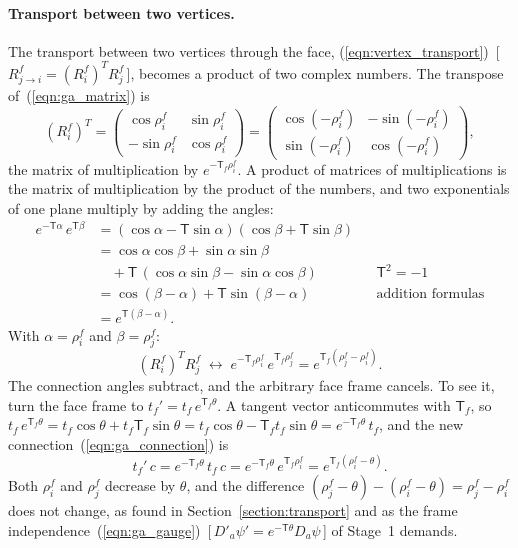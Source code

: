 \paragraph{Transport between two vertices.} The transport between two vertices through the face, (\ref{eqn:vertex_transport})~[\,$R^f_{j\to i} = (R_i^f)^T R_j^f$\,], becomes a product of two complex numbers. The transpose of~(\ref{eqn:ga_matrix}) is
\begin{equation*}
(R_i^f)^T = \begin{pmatrix} \cos\rho_i^f & \sin\rho_i^f \\ -\sin\rho_i^f & \cos\rho_i^f \end{pmatrix} = \begin{pmatrix} \cos(-\rho_i^f) & -\sin(-\rho_i^f) \\ \sin(-\rho_i^f) & \cos(-\rho_i^f) \end{pmatrix},
\end{equation*}
the matrix of multiplication by $e^{-\mathsf T_f\rho_i^f}$. A product of matrices of multiplications is the matrix of multiplication by the product of the numbers, and two exponentials of one plane multiply by adding the angles:
\begin{align*}
e^{-\mathsf T\alpha}\, e^{\mathsf T\beta} &= (\cos\alpha - \mathsf T\sin\alpha)(\cos\beta + \mathsf T\sin\beta) \\
&= \cos\alpha\cos\beta + \sin\alpha\sin\beta \\
&\quad + \mathsf T\,(\cos\alpha\sin\beta - \sin\alpha\cos\beta) && \mathsf T^2 = -1 \\
&= \cos(\beta - \alpha) + \mathsf T\sin(\beta - \alpha) && \text{addition formulas} \\
&= e^{\mathsf T(\beta - \alpha)} .
\end{align*}
With $\alpha = \rho_i^f$ and $\beta = \rho_j^f$:
\begin{equation*}
(R_i^f)^T R_j^f \;\longleftrightarrow\; e^{-\mathsf T_f\rho_i^f}\, e^{\mathsf T_f\rho_j^f} = e^{\mathsf T_f(\rho_j^f - \rho_i^f)} .
\end{equation*}
The connection angles subtract, and the arbitrary face frame cancels. To see it, turn the face frame to $t_f' = t_f\,e^{\mathsf T_f\theta}$. A tangent vector anticommutes with $\mathsf T_f$, so $t_f\,e^{\mathsf T_f\theta} = t_f\cos\theta + t_f\mathsf T_f\sin\theta = t_f\cos\theta - \mathsf T_f t_f\sin\theta = e^{-\mathsf T_f\theta}\, t_f$, and the new connection~(\ref{eqn:ga_connection}) is
\begin{equation*}
t_f'\, c = e^{-\mathsf T_f\theta}\, t_f\, c = e^{-\mathsf T_f\theta}\, e^{\mathsf T_f\rho_i^f} = e^{\mathsf T_f(\rho_i^f - \theta)} .
\end{equation*}
Both $\rho_i^f$ and $\rho_j^f$ decrease by $\theta$, and the difference $(\rho_j^f - \theta) - (\rho_i^f - \theta) = \rho_j^f - \rho_i^f$ does not change, as found in Section~\ref{section:transport} and as the frame independence~(\ref{eqn:ga_gauge})~[\,$D'_a\psi' = e^{-\mathsf T\theta}D_a\psi$\,] of Stage~1 demands.

